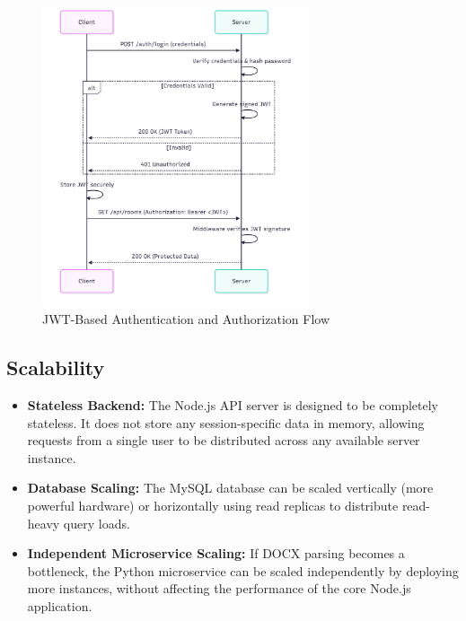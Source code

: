\begin{figure}[htbp]
\centering
\includegraphics[width=0.7\textwidth]{figures/jwt-flow.png}
\caption{JWT-Based Authentication and Authorization Flow}
\label{fig:jwt-flow}
\end{figure}

\FloatBarrier
\subsection{Scalability}
\begin{itemize}
    \item \textbf{Stateless Backend:} The Node.js API server is designed to be completely stateless. It does not store any session-specific data in memory, allowing requests from a single user to be distributed across any available server instance.
    \item \textbf{Database Scaling:} The MySQL database can be scaled vertically (more powerful hardware) or horizontally using read replicas to distribute read-heavy query loads.
    \item \textbf{Independent Microservice Scaling:} If DOCX parsing becomes a bottleneck, the Python microservice can be scaled independently by deploying more instances, without affecting the performance of the core Node.js application.
\end{itemize}
